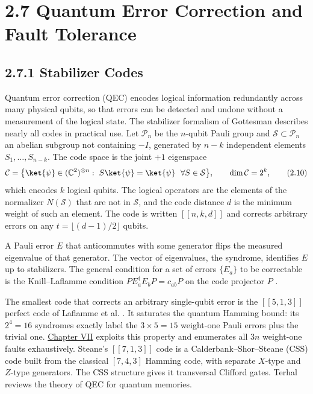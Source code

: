 \documentclass{report}
\theoremstyle{plain}
\theoremstyle{definition}
\theoremstyle{remark}
\newcommand{\C}{\mathbb{C}}
\begin{document}
\section{2.7 Quantum Error Correction and Fault Tolerance}\label{sec:bg:qec}

\subsection{2.7.1 Stabilizer Codes}

Quantum error correction (QEC) encodes logical information redundantly across many physical qubits, so that errors can be detected and undone without a measurement of the logical state. The stabilizer formalism of Gottesman \cite{gottesman1997stabilizer} describes nearly all codes in practical use. Let $\mathcal{P}_n$ be the $n$-qubit Pauli group and $\mathcal{S}\subset\mathcal{P}_n$ an abelian subgroup not containing $-I$, generated by $n-k$ independent elements $S_1,\dots,S_{n-k}$. The code space is the joint $+1$ eigenspace
\hypertarget{eq:bg:stabilizer}{}\[
\mathcal{C}=\bigl\{\ket{\psi}\in(\C^2)^{\otimes n}:\ S\ket{\psi}=\ket{\psi}\ \ \forall S\in\mathcal{S}\bigr\},\qquad \dim\mathcal{C}=2^{k},
\tag{2.10}\]
which encodes $k$ logical qubits. The logical operators are the elements of the normalizer $N(\mathcal{S})$ that are not in $\mathcal{S}$, and the code distance $d$ is the minimum weight of such an element. The code is written $[[n,k,d]]$ and corrects arbitrary errors on any $t=\lfloor(d-1)/2\rfloor$ qubits.

A Pauli error $E$ that anticommutes with some generator flips the measured eigenvalue of that generator. The vector of eigenvalues, the syndrome, identifies $E$ up to stabilizers. The general condition for a set of errors $\{E_a\}$ to be correctable is the Knill--Laflamme condition $PE_a^{\dagger}E_bP=c_{ab}P$ on the code projector $P$ \cite{knill1997theory}.

The smallest code that corrects an arbitrary single-qubit error is the $[[5,1,3]]$ perfect code of Laflamme et al. \cite{laflamme1996perfect}. It saturates the quantum Hamming bound: its $2^4=16$ syndromes exactly label the $3\times5=15$ weight-one Pauli errors plus the trivial one. \hyperref[ch:qec]{Chapter VII} exploits this property and enumerates all $3n$ weight-one faults exhaustively. Steane's $[[7,1,3]]$ code \cite{steane1996codes} is a Calderbank--Shor--Steane (CSS) code \cite{calderbank1996goodcodes} built from the classical $[7,4,3]$ Hamming code, with separate $X$-type and $Z$-type generators. The CSS structure gives it transversal Clifford gates. Terhal \cite{terhal2015qecmemories} reviews the theory of QEC for quantum memories.
\end{document}

